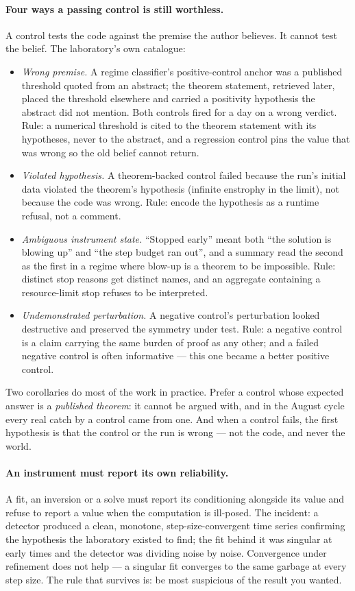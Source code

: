 \documentclass[11pt]{article}
\begin{document}
\paragraph{Four ways a passing control is still worthless.} A control tests the code against
the premise the author believes. It cannot test the belief. The laboratory's own catalogue:
\begin{itemize}[leftmargin=*,itemsep=1pt]
\item \emph{Wrong premise.} A regime classifier's positive-control anchor was a published
  threshold quoted from an abstract; the theorem statement, retrieved later, placed the
  threshold elsewhere and carried a positivity hypothesis the abstract did not mention. Both
  controls fired for a day on a wrong verdict. Rule: a numerical threshold is cited to the
  theorem statement with its hypotheses, never to the abstract, and a regression control pins the
  value that was wrong so the old belief cannot return.
\item \emph{Violated hypothesis.} A theorem-backed control failed because the run's initial
  data violated the theorem's hypothesis (infinite enstrophy in the limit), not because the code
  was wrong. Rule: encode the hypothesis as a runtime refusal, not a comment.
\item \emph{Ambiguous instrument state.} ``Stopped early'' meant both ``the solution is blowing
  up'' and ``the step budget ran out'', and a summary read the second as the first in a regime
  where blow-up is a theorem to be impossible. Rule: distinct stop reasons get distinct names,
  and an aggregate containing a resource-limit stop refuses to be interpreted.
\item \emph{Undemonstrated perturbation.} A negative control's perturbation looked destructive
  and preserved the symmetry under test. Rule: a negative control is a claim carrying the same
  burden of proof as any other; and a failed negative control is often informative --- this one
  became a better positive control.
\end{itemize}
Two corollaries do most of the work in practice. Prefer a control whose expected answer is a
\emph{published theorem}: it cannot be argued with, and in the August cycle every real catch
by a control came from one. And when a control fails, the first hypothesis is that the
control or the run is wrong --- not the code, and never the world.

\paragraph{An instrument must report its own reliability.} A fit, an inversion or a solve
must report its conditioning alongside its value and refuse to report a value when the
computation is ill-posed. The incident: a detector produced a clean, monotone, step-size-convergent
time series confirming the hypothesis the laboratory existed to find; the fit behind it was
singular at early times and the detector was dividing noise by noise. Convergence under
refinement does not help --- a singular fit converges to the same garbage at every step size.
The rule that survives is: be most suspicious of the result you wanted.
\end{document}
